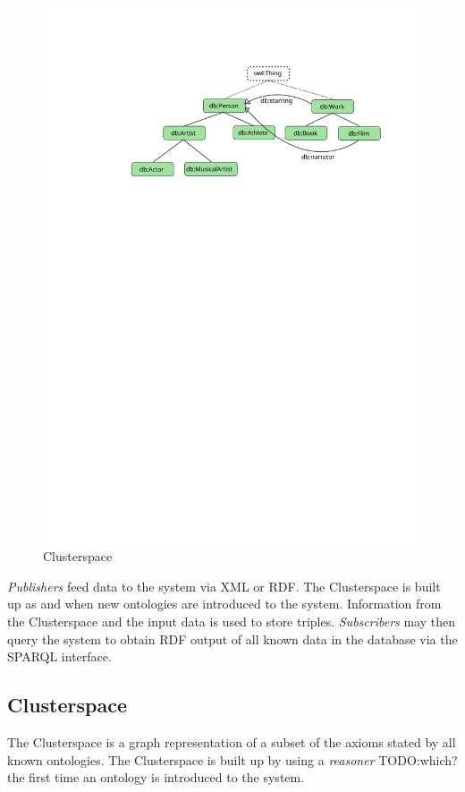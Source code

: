 \documentclass[conference]{IEEEtran}
\begin{document}
\begin{figure}
    \centering
    \includegraphics[scale=0.6]{images/cs}
    \caption{Clusterspace}
    \label{fig:cs}
\end{figure}

\emph{Publishers} feed data to the system via XML or RDF. The Clusterspace is
built up as and when new ontologies are introduced to the system. Information
from the Clusterspace and the input data is used to store triples.
\emph{Subscribers} may then query the system to obtain RDF output of all known
data in the database via the SPARQL interface.

\subsection{Clusterspace}
The Clusterspace is a graph representation of a subset of the axioms stated by
all known ontologies. The Clusterspace is built up by using a \emph{reasoner}
TODO:which? the first time an ontology is introduced to the system.
\end{document}
